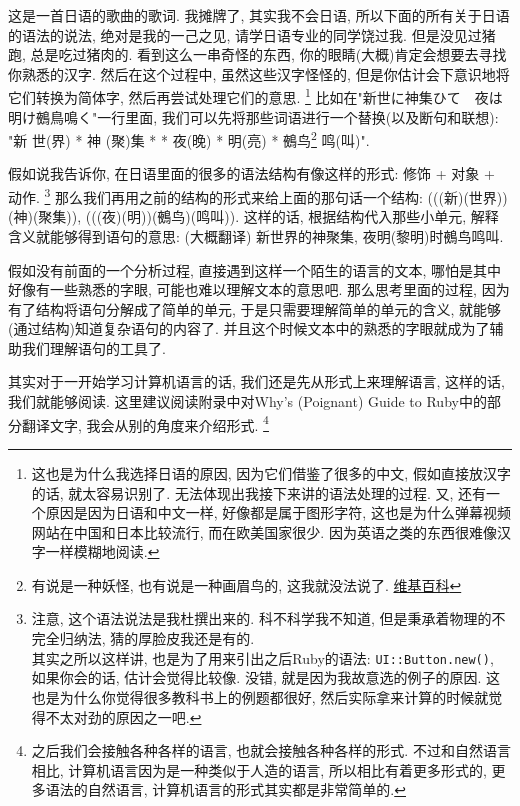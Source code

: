 这是一首日语的歌曲的歌词. 我摊牌了, 其实我不会日语, 所以下面的所有关于日语的语法的说法, 绝对是我的一己之见, 请学日语专业的同学饶过我. 但是没见过猪跑, 总是吃过猪肉的. 看到这么一串奇怪的东西, 你的眼睛(大概)肯定会想要去寻找你熟悉的汉字. 然后在这个过程中, 虽然这些汉字怪怪的, 但是你估计会下意识地将它们转换为简体字, 然后再尝试处理它们的意思. \footnote{这也是为什么我选择日语的原因, 因为它们借鉴了很多的中文, 假如直接放汉字的话, 就太容易识别了. 无法体现出我接下来讲的语法处理的过程. 又, 还有一个原因是因为日语和中文一样, 好像都是属于图形字符, 这也是为什么弹幕视频网站在中国和日本比较流行, 而在欧美国家很少. 因为英语之类的东西很难像汉字一样模糊地阅读. } 比如在"新世に神集ひて　夜は明け鵺鳥鳴く"一行里面, 我们可以先将那些词语进行一个替换(以及断句和联想): "新 世(界) * 神 (聚)集 * *  夜(晚) * 明(亮) * 鵺鸟\footnote{有说是一种妖怪, 也有说是一种画眉鸟的, 这我就没法说了. \href{https://zh.wikipedia.org/wiki/鵺}{维基百科}} 鸣(叫)". 

假如说我告诉你, 在日语里面的很多的语法结构有像这样的形式: 修饰 + 对象 + 动作. \footnote{注意, 这个语法说法是我杜撰出来的. 科不科学我不知道, 但是秉承着物理的不完全归纳法, 猜的厚脸皮我还是有的. \\ 其实之所以这样讲, 也是为了用来引出之后Ruby的语法: \texttt{UI::Button.new()}, 如果你会的话, 估计会觉得比较像. 没错, 就是因为我故意选的例子的原因. 这也是为什么你觉得很多教科书上的例题都很好, 然后实际拿来计算的时候就觉得不太对劲的原因之一吧. } 那么我们再用之前的结构的形式来给上面的那句话一个结构: (((新)(世界))(神)(聚集)), (((夜)(明))(鵺鸟)(鸣叫)). 这样的话, 根据结构代入那些小单元, 解释含义就能够得到语句的意思: (大概翻译) 新世界的神聚集, 夜明(黎明)时鵺鸟鸣叫. 

假如没有前面的一个分析过程, 直接遇到这样一个陌生的语言的文本, 哪怕是其中好像有一些熟悉的字眼, 可能也难以理解文本的意思吧. 那么思考里面的过程, 因为有了结构将语句分解成了简单的单元, 于是只需要理解简单的单元的含义, 就能够(通过结构)知道复杂语句的内容了. 并且这个时候文本中的熟悉的字眼就成为了辅助我们理解语句的工具了. 

其实对于一开始学习计算机语言的话, 我们还是先从形式上来理解语言, 这样的话, 我们就能够阅读. 这里建议阅读附录中对Why's (Poignant) Guide to Ruby中的部分翻译文字, 我会从别的角度来介绍形式. \footnote{之后我们会接触各种各样的语言, 也就会接触各种各样的形式. 不过和自然语言相比, 计算机语言因为是一种类似于人造的语言, 所以相比有着更多形式的, 更多语法的自然语言, 计算机语言的形式其实都是非常简单的. }

